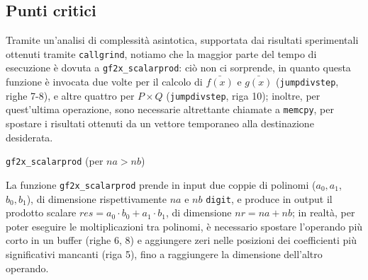 \subsection*{\textbf{Punti critici}}\label{crit}
Tramite un'analisi di complessità asintotica, supportata dai risultati sperimentali ottenuti tramite \texttt{callgrind}, notiamo che la 
maggior parte del tempo di esecuzione è dovuta a \texttt{gf2x\_scalarprod}: ciò non ci sorprende, in quanto
questa funzione è invocata due volte per il calcolo di $\bar{f(x)}$ e $\bar{g(x)}$ (\texttt{jumpdivstep}, righe 7-8), e altre quattro per $P \times Q$ (\texttt{jumpdivstep}, riga 10); inoltre,
per quest'ultima operazione, sono necessarie altrettante chiamate a \texttt{memcpy}, per spostare i risultati ottenuti da un vettore temporaneo alla
destinazione desiderata.
\begin{algorithm}
    \small
    \SetAlgoLined
    \BlankLine

    \caption{\texttt{gf2x\_scalarprod} (per $na > nb$)}
    \end{algorithm}

La funzione \texttt{gf2x\_scalarprod} prende in input due coppie di polinomi ($a_{0},a_{1}$, $b_{0},b_{1}$), di dimensione rispettivamente $na$ e $nb$ \texttt{digit}, e 
produce in output il prodotto scalare $res = a_{0} \cdot b_{0} + a_{1} \cdot b_{1}$, di dimensione $nr = na+nb$; in realtà, per poter eseguire le moltiplicazioni
tra polinomi, è necessario spostare l'operando più corto in un buffer (righe 6, 8) e aggiungere zeri nelle posizioni dei coefficienti più significativi mancanti (riga 5), fino
a raggiungere la dimensione dell'altro operando. 

